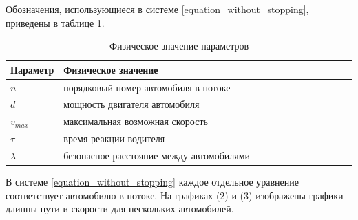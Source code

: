 \documentclass[12pt, a4paper]{extarticle}
\numberwithin{equation}{section}
\begin{document}
Обозначения, использующиеся в системе \eqref{equation_without_stopping}, приведены в таблице \ref{parameters}.

\begin{table}[h]
	\caption{Физическое значение параметров}
	\label{parameters}
	\begin{center}
		\begin{tabularx}{\textwidth}{p{0.15\linewidth}p{0.85\linewidth}}			
			\hline
			\rule{0cm}{0,5cm}
			Параметр &  Физическое значение \\ 
			[3pt]\hline
			$n$ & порядковый номер автомобиля в потоке\\
			$d$ & мощность двигателя автомобиля \\
			$v_{max}$ & максимальная возможная скорость \\
			$\tau$ & время реакции водителя \\
			$\lambda $ & безопасное расстояние между автомобилями \\ 
			\hline
		\end{tabularx}
	\end{center}
\end{table}

В системе \eqref{equation_without_stopping} каждое отдельное уравнение соответствует автомобилю в потоке. На графиках (2) и (3) изображены графики длинны пути и скорости для нескольких автомобилей.
\end{document}
